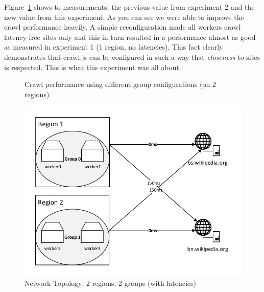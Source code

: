 Figure~\ref{plot:exp_003} shows to measurements, the previous value from experiment 2 and the new value from this experiment. As you can see we were able to improve the crawl performance heavily. A simple reconfiguration made all workers crawl latency-free sites only and this in turn resulted in a performance almost as good as measured in experiment 1 (1 region, no latencies). This fact clearly demonstrates that crawl.js can be configured in such a way that \emph{closeness} to sites is respected. This is what this experiment was all about.

\begin{figure}
  \centering
  \caption{Crawl performance using different group configurations (on 2 regions)}
  \label{plot:exp_003}
\end{figure}

\begin{figure}[h]
\centering
  \includegraphics[width=1.0\textwidth]{Figures/topology_exp3.pdf}
  \caption{Network Topology: 2 regions, 2 groups (with latencies)}
\label{topology_exp3}
\end{figure}
